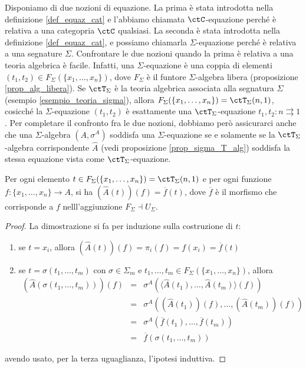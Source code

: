 \begin{remark}\label{oss_equaz_alg_cat}
 Disponiamo di due nozioni di equazione. La prima è stata introdotta nella definizione \ref{def_equaz_cat} e l'abbiamo
 chiamata \(\ctC\)-equazione perché è relativa a una categopria \(\ctC\) qualsiasi. La seconda è stata introdotta nella
 definizione \ref{def_equaz_cat}, e possiamo chiamarla \(\Sigma\)-equazione perché è relativa a una segnature \(\Sigma\).
 Confrontare le due nozioni quando la prima è
 relativa a una teoria algebrica è facile.  Infatti, una \(\Sigma\)-equazione è una coppia di elementi
 \((t_1,t_2) \in F_\Sigma(\{x_1,\ldots,x_n\})\), dove \(F_\Sigma\) è il funtore \(\Sigma\)-algebra libera (proposizione
 \ref{prop_alg_libera}). Se \(\ctT_\Sigma\) è la teoria algebrica associata alla segnatura \(\Sigma\) (esempio
 \ref{esempio_teoria_sigma}), allora \(F_\Sigma(\{x_1,\ldots,x_n\}) = \ctT_\Sigma(n,1)\),
 cosicché la \(\Sigma\)-equazione \((t_1,t_2)\) è esattamente una \(\ctT_\Sigma\)-equazione \(t_1,t_2 \colon n \rightrightarrows 1\).
 Per completare il confronto fra le due nozioni, dobbiamo però assicurarci anche che una \(\Sigma\)-algebra \((A,\sigma^A)\)
 soddisfa una \(\Sigma\)-equazione se e solamente se la \(\ctT_\Sigma\)-algebra corrispondente \(\widehat{A}\)
 (vedi proposizione \ref{prop_sigma_T_alg}) soddisfa la stessa equazione vista come \(\ctT_\Sigma\)-equazione.
\end{remark}

\begin{lemma}\label{lemma_equaz_alg_cat}
 Per ogni elemento \(t \in F_\Sigma(\{x_1,\ldots,x_n\}) = \ctT_\Sigma(n,1)\) e per ogni funzione \(f \colon \{x_1,\ldots,x_n\} \to A\),
 si ha \((\widehat{A}(t))(f) = \overline{f}(t)\), dove \(\overline{f}\) è il morfismo che corrisponde a \(f\) nelll'aggiunzione
 \(F_\Sigma \dashv U_\Sigma\).
\end{lemma}

\begin{proof}
 La dimostrazione si fa per induzione sulla costruzione di \(t\):
 \begin{enumerate}
  \item[(i)] se \(t = x_i\), allora \((\widehat{A}(t))(f) = \pi_i(f) = f(x_i) = \overline{f}(t)\)
  \item[(ii)] se \(t = \sigma(t_1,\ldots,t_m)\) con \(\sigma \in \Sigma_m\) e \(t_1,\ldots,t_m \in F_\Sigma(\{x_1,\ldots,x_n\})\), allora
        \[\begin{array}{rcl}
          (\widehat{A}(\sigma(t_1,\ldots,t_m)))(f) & = & \sigma^A(\langle\widehat{A}(t_1),\ldots,\widehat{A}(t_m)\rangle(f)) \\
                                                   & = & \sigma^A((\widehat{A}(t_1))(f), \ldots, (\widehat{A}(t_m))(f))      \\
                                                   & = & \sigma^A(\overline{f}(t_1), \ldots, \overline{f}(t_m))              \\
                                                   & = & \overline{f}(\sigma(t_1, \ldots, t_m))
         \end{array}\]
 \end{enumerate}
 avendo usato, per la terza uguaglianza, l'ipotesi induttiva.
\end{proof}

